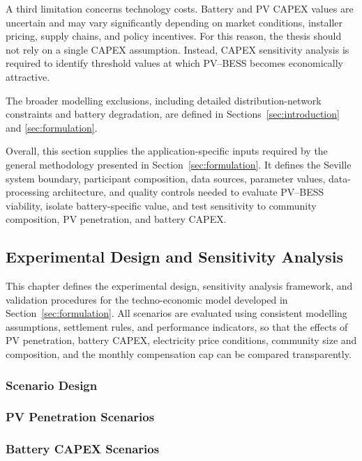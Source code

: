 A third limitation concerns technology costs. Battery and PV CAPEX values are uncertain and may vary significantly depending on market conditions, installer pricing, supply chains, and policy incentives. For this reason, the thesis should not rely on a single CAPEX assumption. Instead, CAPEX sensitivity analysis is required to identify threshold values at which PV--BESS becomes economically attractive.

The broader modelling exclusions, including detailed distribution-network constraints and
battery degradation, are defined in Sections~\ref{sec:introduction} and
\ref{sec:formulation}.

Overall, this section supplies the application-specific inputs required by the general methodology presented in Section~\ref{sec:formulation}. It defines the Seville system boundary, participant composition, data sources, parameter values, data-processing architecture, and quality controls needed to evaluate PV--BESS viability, isolate battery-specific value, and test sensitivity to community composition, PV penetration, and battery CAPEX.

\subsection{Experimental Design and Sensitivity Analysis}
\label{sec:experimental}

This chapter defines the experimental design, sensitivity analysis framework, and validation procedures for the techno-economic model developed in Section~\ref{sec:formulation}. All scenarios are evaluated using consistent modelling assumptions, settlement rules, and performance indicators, so that the effects of PV penetration, battery CAPEX, electricity price conditions, community size and composition, and the monthly compensation cap can be compared transparently.

\subsubsection{Scenario Design}
\label{subsec:scenario_design}

\subsubsection{PV Penetration Scenarios}
\label{subsec:pv_penetration_scenarios}

\subsubsection{Battery CAPEX Scenarios}
\label{subsec:battery_capex_scenarios}

